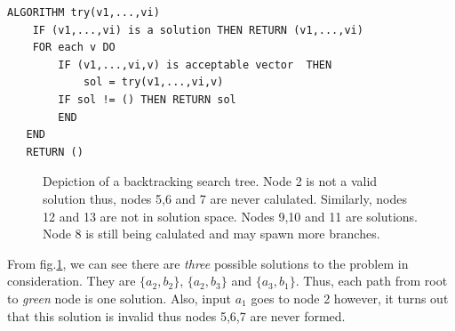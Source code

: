 \documentclass[a4paper]{article}
\begin{document}
\begin{lstlisting}
ALGORITHM try(v1,...,vi)
	IF (v1,...,vi) is a solution THEN RETURN (v1,...,vi) 
   	FOR each v DO 
   		IF (v1,...,vi,v) is acceptable vector  THEN 
        	sol = try(v1,...,vi,v) 
        IF sol != () THEN RETURN sol 
        END 
   END 
   RETURN ()
\end{lstlisting}
\begin{figure}[!htbp]
\begin{center}
\end{center}
\caption{Depiction of a backtracking search tree. Node 2 is not a valid solution thus, nodes 5,6 and 7 are never calulated. Similarly, nodes 12 and 13 are not in solution space. Nodes 9,10 and 11 are solutions. Node 8 is still being calulated and may spawn more branches.}\label{backfig}
\end{figure}

From fig.\ref{backfig}, we can see there are \emph{three} possible solutions to the problem in consideration. They are $\{a_{2}, b_{2}\}$, $\{a_{2},b_{3}\}$ and $\{a_{3},b_{1}\}$. Thus, each path from root to \emph{green} node is one solution. Also, input $a_{1}$ goes to node 2 however, it turns out that this solution is invalid thus nodes 5,6,7 are never formed.
\end{document}
